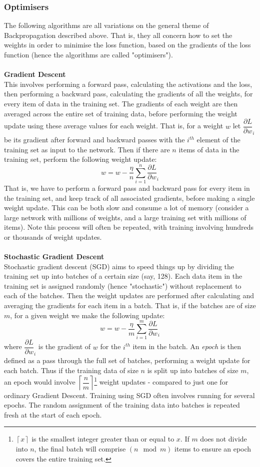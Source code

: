 \documentclass[11pt]{article} %
\theoremstyle{plain}
\theoremstyle{definition}
\begin{document}
\subsubsection{Optimisers}
The following algorithms are all variations on the general theme of Backpropagation described above. That is, they all concern how to set the weights in order to minimise the loss function, based on the gradients of the loss function (hence the algorithms are called "optimisers"). 
\\
\\
\noindent
\textbf{Gradient Descent}
\\
\noindent
This involves performing a forward pass, calculating the activations and the loss, then performing a backward pass, calculating the gradients of all the weights, for every item of data in the training set. The gradients of each weight are then averaged across the entire set of training data, before performing the weight update using these average values for each weight. That is, for a weight \(w\) let  \({\dfrac{\partial L}{\partial w}}_i\) be its gradient after  forward and backward passes with the \(i^{th}\) element of the training set as input to the network. Then if there are \(n\) items of data in the training set, perform the following weight update:
\[ w = w - \dfrac{\eta}{n}\sum_{i=1}^{n} {\dfrac{\partial L}{\partial w}}_i \]
That is, we have to perform a forward pass and backward pass for every item in the training set, and keep track of all associated gradients, before making a single weight update. This can be both slow and consume a lot of memory (consider a large network with millions of weights, and a large training set with millions of items). Note this process will often be repeated, with training involving hundreds or thousands of weight updates.
\\
\\
\noindent
\textbf{Stochastic Gradient Descent}
\\
\noindent
Stochastic gradient descent (SGD) aims to speed things up by dividing the training set up into batches of a certain size (say, 128). Each data item in the training set is assigned randomly (hence "stochastic") without replacement to each of the batches. Then the weight updates are performed after calculating and averaging the gradients for each item in a batch. That is, if the batches are of size \(m\), for a given weight we make the following update:
\[ w = w - \dfrac{\eta}{m}\sum_{i=1}^{m} {\dfrac{\partial L}{\partial w}}_i \]
where \({\dfrac{\partial L}{\partial w}}_i\) is the gradient of \(w\) for the \(i^{th}\) item in the batch. An \textit{epoch} is then defined as a pass through the full set of batches, performing a weight update for each batch. Thus if the training data of size \(n\) is split up into batches of size \(m\), an epoch would involve \( \left \lceil{\dfrac{n}{m}}\right \rceil \)\footnote{\( \left \lceil{x}\right \rceil \) is the smallest integer greater than or equal to \(x\). If \(m\) does not divide into \(n\), the final batch will comprise \((n \mod m)\) items to ensure an epoch covers the entire training set.} weight updates - compared to just one for ordinary Gradient Descent. Training using SGD often involves running for several epochs. The random assignment of the training data into batches is repeated fresh at the start of each epoch.
\end{document}
